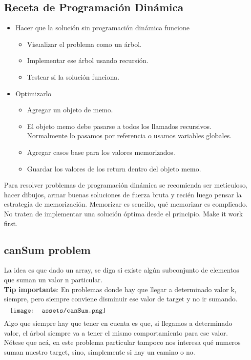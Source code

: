 \documentclass[10pt,a4paper]{article}
\begin{document}
\subsection*{Receta de Programación Dinámica}
\begin{itemize}
    \item Hacer que la solución sin programación dinámica funcione
    \begin{itemize}
        \item Visualizar el problema como un árbol.
        \item Implementar ese árbol usando recursión.
        \item Testear si la solución funciona. 
    \end{itemize}
    \item Optimizarlo
    \begin{itemize}
        \item Agregar un objeto de memo.
        \item El objeto memo debe pasarse a todos los llamados recursivos. Normalmente lo pasamos por referencia o usamos variables globales.
        \item Agregar casos base para los valores memorizados.
        \item Guardar los valores de los return dentro del objeto memo.
    \end{itemize}
\end{itemize}
Para resolver problemas de programación dinámica se recomienda ser meticuloso, hacer dibujos, armar buenas soluciones de fuerza bruta y recién luego pensar la estrategia de memorización. Memorizar es sencillo, qué memorizar es complicado. \\
No traten de implementar una solución óptima desde el principio. Make it work first.
\subsection*{canSum problem}
La idea es que dado un array, se diga si existe algún subconjunto de elementos que suman un valor n particular. \\
\textbf{Tip importante}: En problemas donde hay que llegar a determinado valor k, siempre, pero siempre conviene disminuir ese valor de target y no ir sumando.
\[\begin{minipage}[b]{1\textwidth}
    \texttt{[image: assets/canSum.png]}
\end{minipage}\]
Algo que siempre hay que tener en cuenta es que, si llegamos a determinado valor, el árbol siempre va a tener el mismo comportamiento para ese valor. Nótese que acá, en este problema particular tampoco nos interesa qué numeros suman nuestro target, sino, simplemente si hay un camino o no.
\end{document}
